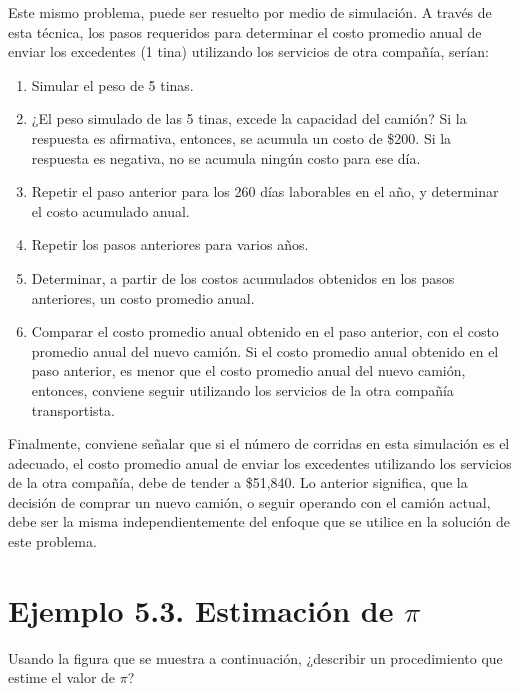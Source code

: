 \documentclass[11pt,letterpaper]{report}
\begin{document}
Este mismo problema, puede ser resuelto por medio de simulación. A través
de esta técnica, los pasos requeridos para determinar el costo promedio
anual de enviar los excedentes (1 tina) utilizando los servicios de otra
compañía, serían:

\begin{enumerate}[label=\arabic*.]
\item Simular el peso de 5 tinas.
\item ¿El peso simulado de las 5 tinas, excede la capacidad del camión? Si
la respuesta es afirmativa, entonces, se acumula un costo de \$200. Si la
respuesta es negativa, no se acumula ningún costo para ese día.
\item Repetir el paso anterior para los 260 días laborables en el año, y
determinar el costo acumulado anual.
\item Repetir los pasos anteriores para varios años.
\item Determinar, a partir de los costos acumulados obtenidos en los pasos
anteriores, un costo promedio anual.
\item Comparar el costo promedio anual obtenido en el paso anterior, con el
costo promedio anual del nuevo camión. Si el costo promedio anual obtenido
en el paso anterior, es menor que el costo promedio anual del nuevo camión,
entonces, conviene seguir utilizando los servicios de la otra compañía
transportista.
\end{enumerate}

Finalmente, conviene señalar que si el número de corridas en esta
simulación es el adecuado, el costo promedio anual de enviar los excedentes
utilizando los servicios de la otra compañía, debe de tender a \$51,840. Lo
anterior significa, que la decisión de comprar un nuevo camión, o seguir
operando con el camión actual, debe ser la misma independientemente del
enfoque que se utilice en la solución de este problema.

\section*{Ejemplo 5.3. Estimación de $\pi$}

Usando la figura que se muestra a continuación, ¿describir un procedimiento
que estime el valor de $\pi$?

\begin{figure}[H]
\centering
{}
\end{figure}
\end{document}
